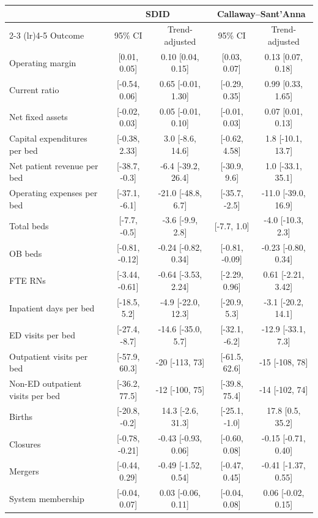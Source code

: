 \begin{tabular}{lcccc}
\toprule
 & \multicolumn{2}{c}{SDID} & \multicolumn{2}{c}{Callaway--Sant'Anna} \\
\cmidrule(lr){2-3} \cmidrule(lr){4-5}
Outcome & 95\% CI & Trend-adjusted & 95\% CI & Trend-adjusted \\
\midrule
Operating margin & [0.01, 0.05] & 0.10 [0.04, 0.15] & [0.03, 0.07] & 0.13 [0.07, 0.18] \\
Current ratio & [-0.54, 0.06] & 0.65 [-0.01, 1.30] & [-0.29, 0.35] & 0.99 [0.33, 1.65] \\
Net fixed assets & [-0.02, 0.03] & 0.05 [-0.01, 0.10] & [-0.01, 0.03] & 0.07 [0.01, 0.13] \\
Capital expenditures per bed & [-0.38, 2.33] & 3.0 [-8.6, 14.6] & [-0.62, 4.58] & 1.8 [-10.1, 13.7] \\
Net patient revenue per bed & [-38.7, -0.3] & -6.4 [-39.2, 26.4] & [-30.9, 9.6] & 1.0 [-33.1, 35.1] \\
Operating expenses per bed & [-37.1, -6.1] & -21.0 [-48.8, 6.7] & [-35.7, -2.5] & -11.0 [-39.0, 16.9] \\
\addlinespace
Total beds & [-7.7, -0.5] & -3.6 [-9.9, 2.8] & [-7.7, 1.0] & -4.0 [-10.3, 2.3] \\
OB beds & [-0.81, -0.12] & -0.24 [-0.82, 0.34] & [-0.81, -0.09] & -0.23 [-0.80, 0.34] \\
FTE RNs & [-3.44, -0.61] & -0.64 [-3.53, 2.24] & [-2.29, 0.96] & 0.61 [-2.21, 3.42] \\
Inpatient days per bed & [-18.5, 5.2] & -4.9 [-22.0, 12.3] & [-20.9, 5.3] & -3.1 [-20.2, 14.1] \\
\addlinespace
ED visits per bed & [-27.4, -8.7] & -14.6 [-35.0, 5.7] & [-32.1, -6.2] & -12.9 [-33.1, 7.3] \\
Outpatient visits per bed & [-57.9, 60.3] & -20 [-113, 73] & [-61.5, 62.6] & -15 [-108, 78] \\
Non-ED outpatient visits per bed & [-36.2, 77.5] & -12 [-100, 75] & [-39.8, 75.4] & -14 [-102, 74] \\
Births & [-20.8, -0.2] & 14.3 [-2.6, 31.3] & [-25.1, -1.0] & 17.8 [0.5, 35.2] \\
\addlinespace
Closures & [-0.78, -0.21] & -0.43 [-0.93, 0.06] & [-0.60, 0.08] & -0.15 [-0.71, 0.40] \\
Mergers & [-0.44, 0.29] & -0.49 [-1.52, 0.54] & [-0.47, 0.45] & -0.41 [-1.37, 0.55] \\
System membership & [-0.04, 0.07] & 0.03 [-0.06, 0.11] & [-0.04, 0.08] & 0.06 [-0.02, 0.15] \\
\bottomrule
\end{tabular}
